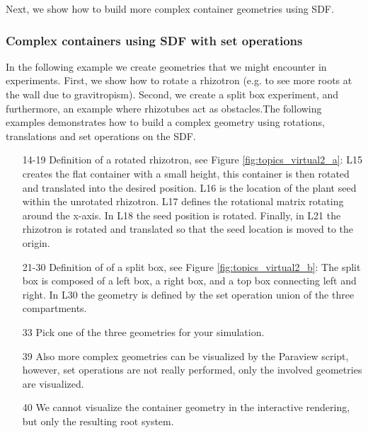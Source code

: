 

Next, we show how to build more complex container geometries using SDF. 


\subsubsection*{Complex containers using SDF with set operations}

In the following example we create geometries that we might encounter in experiments. 
First, we show how to rotate a rhizotron (e.g. to see more roots at the wall due to gravitropism). 
Second, we create a split box experiment, and furthermore, an example where rhizotubes act as obstacles.The following examples demonstrates how to build a complex geometry using rotations, translations and set operations on the SDF.



\begin{itemize}
\item[14-19] Definition of a rotated rhizotron, see Figure \ref{fig:topics_virtual2_a}: 
L15 creates the flat container with a small height, this container is then rotated and translated into the desired position. L16 is the location of the plant seed within the unrotated rhizotron. L17 defines the rotational matrix rotating around the x-axis. In L18 the seed position is rotated. Finally, in L21 the rhizotron is rotated and translated so that the seed location is moved to the origin. 
\item[21-30] Definition of of a split box, see Figure \ref{fig:topics_virtual2_b}: 
The split box is composed of a left box, a right box, and a top box connecting left and right. 
In L30 the geometry is defined by the set operation union of the three compartments. 
\item[33] Pick one of the three geometries for your simulation.
\item[39] Also more complex geometries can be visualized by the Paraview script, 
however, set operations are not really performed, only the involved geometries are visualized.
\item[40] We cannot visualize the container geometry in the interactive rendering, but only the resulting root system. 
\end{itemize}

